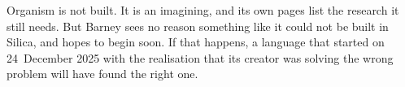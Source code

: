 Organism is not built. It is an imagining, and its own pages list the research
it still needs. But Barney sees no reason something like it could not be built
in Silica, and hopes to begin soon. If that happens, a language that started on
24~December 2025 with the realisation that its creator was solving the wrong
problem will have found the right one.


